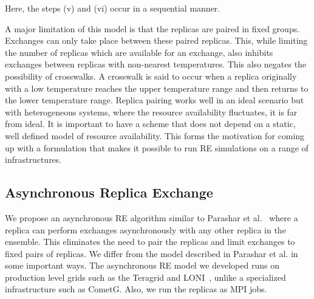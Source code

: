 \documentclass[a4paper,10pt]{article}
\newcommand{\jhanote}[1]{ {\textcolor{red} { ***shantenu: #1 }}}
\newcommand{\jhanote}[1]{}
\begin{document}
Here, the steps (v) and (vi) occur in a sequential manner.
 
A major limitation of this model is that the replicas are paired in fixed groups. 
Exchanges can only take place between these paired replicas.
This, while limiting the number of replicas which are available for an exchange, also inhibits exchanges between replicas with non-nearest temperatures. This also negates the possibility of crosswalks. A crosswalk is said to occur when a replica originally with a low temperature reaches the upper temperature range and then returns to the lower temperature range. %
Replica pairing works well in an ideal scenario but with heterogeneous systems, 
where the resource availability fluctuates, it is far from ideal. It is 
important to have a scheme that does not depend on a static, well defined 
model of resource availability. This forms the motivation for coming up 
with a formulation that makes it possible to run RE simulations on a range of infrastructures.
  

  
\subsection{Asynchronous Replica Exchange}

We propose an asynchronous RE algorithm similar to Parashar et al.~\cite{parashar_arepex}
where a replica can perform exchanges asynchronously with any other replica in the ensemble. This eliminates the need to pair the replicas and limit exchanges to fixed pairs of replicas. We differ from the model described in Parashar et al. in some important ways. The asynchronous RE model we developed runs on production level grids such as the Teragrid and LONI~\cite{LONI_web}, unlike a specialized infrastructure such as CometG. Also, we run the replicas as MPI jobs. 
\end{document}
